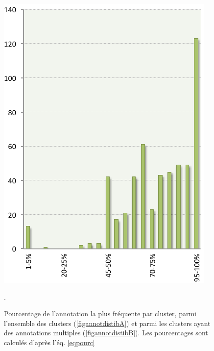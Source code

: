 \begin{figure}
\begin{minipage}{0.5\textwidth}
      \includegraphics[width=\textwidth]{./img/protein_annot_distibB.png}            		\subcaption{}\label{figannotdistibB}
      \end{minipage}
      \caption[Pourcentage de l'annotation la plus fréquente par cluster]{Pourcentage de l'annotation la plus fréquente par cluster, parmi l'ensemble des clusters (\ref{figannotdistibA}) et parmi les clusters ayant des annotations multiples (\ref{figannotdistibB}). Les pourcentages sont calculés d'après l'éq. \ref{eqpourc}}\label{figannotdistib}.
\end{figure}    

